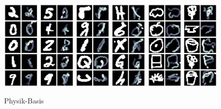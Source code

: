 \begin{figure}[!ht]
    \centering
    \includegraphics[width=0.32\textwidth]{images/resultate/physics-base-mnist.png}
    \includegraphics[width=0.32\textwidth]{images/resultate/physics-base-emnist.png}
    \includegraphics[width=0.32\textwidth]{images/resultate/physics-base-quickdraw.png}
    \caption{Physik-Basis}
    \label{fig:Physik-Basis}
\end{figure}

